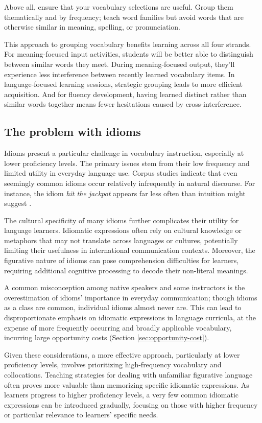 Above all, ensure that your vocabulary selections are useful. Group them thematically and by frequency; teach word families but avoid words that are otherwise similar in meaning, spelling, or pronunciation.

This approach to grouping vocabulary benefits learning across all four strands. For meaning-focused input activities, students will be better able to distinguish between similar words they meet. During meaning-focused output, they'll experience less interference between recently learned vocabulary items. In language-focused learning sessions, strategic grouping leads to more efficient acquisition. And for fluency development, having learned distinct rather than similar words together means fewer hesitations caused by cross-interference.

\subsection{The problem with idioms}

Idioms present a particular challenge in vocabulary instruction, especially at lower proficiency levels. The primary issues stem from their low frequency and limited utility in everyday language use. Corpus studies indicate that even seemingly common idioms occur relatively infrequently in natural discourse. For instance, the idiom \textit{hit the jackpot} appears far less often than intuition might suggest \citep{reynolds2007idioms}.

The cultural specificity of many idioms further complicates their utility for language learners. Idiomatic expressions often rely on cultural knowledge or metaphors that may not translate across languages or cultures, potentially limiting their usefulness in international communication contexts. Moreover, the figurative nature of idioms can pose comprehension difficulties for learners, requiring additional cognitive processing to decode their non-literal meanings.

A common misconception among native speakers and some instructors is the overestimation of idioms' importance in everyday communication; though idioms as a class are common, individual idioms almost never are. This can lead to disproportionate emphasis on idiomatic expressions in language curricula, at the expense of more frequently occurring and broadly applicable vocabulary, incurring large opportunity costs (Section \ref{sec:opportunity-cost}).

Given these considerations, a more effective approach, particularly at lower proficiency levels, involves prioritizing high-frequency vocabulary and collocations. Teaching strategies for dealing with unfamiliar figurative language often proves more valuable than memorizing specific idiomatic expressions. As learners progress to higher proficiency levels, a very few common idiomatic expressions can be introduced gradually, focusing on those with higher frequency or particular relevance to learners' specific needs.


